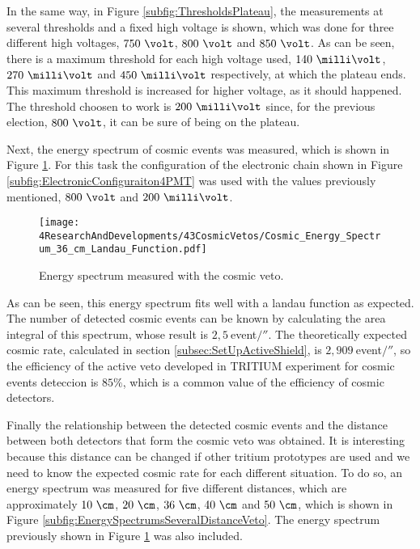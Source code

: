 In the same way, in Figure \ref{subfig:ThresholdsPlateau}, the measurements at several thresholds and a fixed high voltage is shown, which was done for three different high voltages, $750~\volt$, $800~\volt$ and $850~\volt$. As can be seen, there is a maximum threshold for each high voltage used,  $140~\milli\volt$, $270~\milli\volt$ and $450~\milli\volt$ respectively, at which the plateau ends. This maximum threshold is increased for higher voltage, as it should happened. The threshold choosen to work is $200~\milli\volt$ since, for the previous election, $800~\volt$, it can be sure of being on the plateau. 

Next, the energy spectrum of cosmic events was measured, which is shown in Figure \ref{fig:EnergySpectrumCosmicVeto}. For this task the configuration of the electronic chain shown in Figure \ref{subfig:ElectronicConfiguraiton4PMT} was used with the values previously mentioned, $800~\volt$ and $200~\milli\volt$. 

\begin{figure}[h]
\centering
\texttt{[image: 4ResearchAndDevelopments/43CosmicVetos/Cosmic\_Energy\_Spectrum\_36\_cm\_Landau\_Function.pdf]}
\caption{Energy spectrum measured with the cosmic veto.\label{fig:EnergySpectrumCosmicVeto}}
\end{figure}

As can be seen, this energy spectrum fits well with a landau function as expected. The number of detected cosmic events can be known by calculating the area integral of this spectrum, whose result is $2,5~$event$/\second$. The theoretically expected cosmic rate, calculated in section \ref{subsec:SetUpActiveShield}, is $2,909~$event$/\second$, so the efficiency of the active veto developed in TRITIUM experiment for cosmic events deteccion is $85\%$, which is a common value of the efficiency of cosmic detectors.

Finally the relationship between the detected cosmic events and the distance between both detectors that form the cosmic veto was obtained. It is interesting because this distance can be changed if other tritium prototypes are used and we need to know the expected cosmic rate for each different situation. To do so, an energy spectrum was measured for five different distances, which are approximately $10~\cm$, $20~\cm$, $36~\cm$, $40~\cm$ and $50~\cm$, which is shown in Figure \ref{subfig:EnergySpectrumsSeveralDistanceVeto}. The energy spectrum previously shown in Figure \ref{fig:EnergySpectrumCosmicVeto} was also included. 

